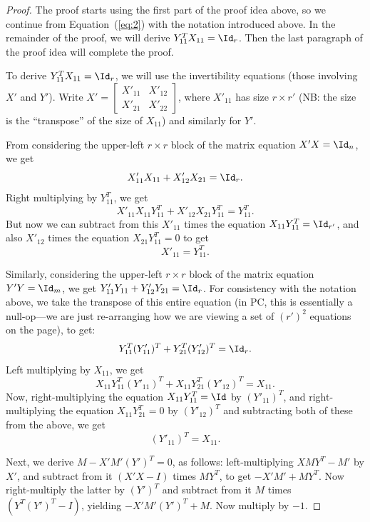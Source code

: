 \begin{proof}
The proof starts using the first part of the proof idea above, so we continue from Equation~(\ref{eq:2}) with the notation introduced above.
In the remainder of the proof, we will derive $Y_{11}^T X_{11} = \Id_r$. Then the last paragraph of the proof idea will complete the proof.

To derive $Y_{11}^T X_{11} = \Id_r$, we will use the invertibility equations (those involving $X'$ and $Y'$). Write $X' = \begin{bmatrix} X'_{11} & X'_{12} \\ X'_{21} & X'_{22} \end{bmatrix}$, where $X'_{11}$ has size $r \times r'$ (NB: the size is the ``transpose'' of the size of $X_{11}$) and similarly for $Y'$. 

From considering the upper-left $r \times r$ block of the matrix equation $X' X = \Id_n$, we get
\[
X'_{11} X_{11} + X'_{12} X_{21} = \Id_r.
\]
Right multiplying by $Y_{11}^T$, we get
\[
X'_{11} X_{11} Y_{11}^T + X'_{12} X_{21} Y_{11}^T = Y_{11}^T. 
\]
But now we can subtract from this $X'_{11}$ times the equation $X_{11} Y_{11}^T = \Id_{r'}$, and also $X'_{12}$ times the equation $X_{21} Y_{11}^T = 0$ to get
\begin{equation}
X'_{11} = Y_{11}^T.
\end{equation}

Similarly, considering the upper-left $r \times r$ block of the matrix equation $Y' Y = \Id_m$, we get $Y'_{11} Y_{11} + Y'_{12} Y_{21} = \Id_{r}$. For consistency with the notation above, we take the transpose of this entire equation (in PC, this is essentially a null-op---we are just re-arranging how we are viewing a set of $(r')^2$ equations on the page), to get:
\[
Y_{11}^T (Y'_{11})^T + Y_{21}^T (Y'_{12})^T = \Id_r.
\]
Left multiplying by $X_{11}$, we get
\[
X_{11} Y_{11}^T (Y'_{11})^T + X_{11} Y_{21}^T (Y'_{12})^T = X_{11}.
\]
Now, right-multiplying the equation $X_{11} Y_{11}^T = \Id$ by $(Y'_{11})^T$, and right-multiplying the equation $X_{11} Y_{21}^T = 0$ by $(Y'_{12})^T$ and subtracting both of these from the above, we get
\begin{equation}
(Y'_{11})^T = X_{11}.
\end{equation}

Next, we derive $M - X' M' (Y')^T=0$, as follows: left-multiplying $XMY^T - M'$ by $X'$, and subtract from it $(X'X-I)$ times $MY^T$, to get $-X'M' + MY^T$. Now right-multiply the latter by $(Y')^T$ and subtract from it $M$ times $(Y^T (Y')^T - I)$, yielding $-X'M'(Y')^T + M$. Now multiply by $-1$.


\end{proof}
